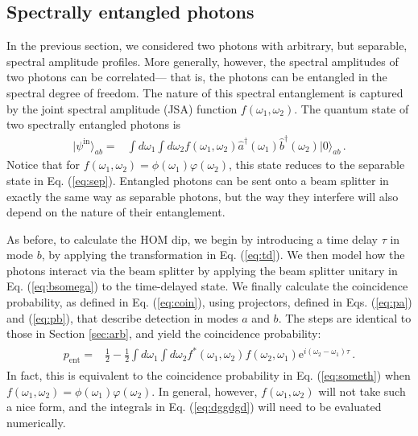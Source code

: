 \documentclass[12pt]{article}
\newcommand{\ket}[2] {| #1 \rangle_{#2}}
\newcommand{\dg}{^{\dagger}}
\newcommand{\ee}[1] {\mathrm{e}^{#1}}
\begin{document}
\subsection{Spectrally entangled photons}

In the previous section, we considered two photons with arbitrary, but separable, spectral amplitude profiles. More generally, however, the spectral amplitudes of two photons can be correlated--- that is, the photons can be entangled in the spectral degree of freedom. The nature of this spectral entanglement is captured by the joint spectral amplitude (JSA) function $f(\omega_1,\omega_2)$. The quantum state of two spectrally entangled photons is
\begin{align}\label{eq:entangled}
\ket{\psi^{\mathrm{in}}}{ab}={}&\int d\omega_1\int d\omega_2f(\omega_1,\omega_2)\hat{a}\dg(\omega_1)\hat{b}\dg(\omega_2)\ket{0}{ab}\,.
\end{align}
Notice that for $f(\omega_{1},\omega_{2})=\phi(\omega_{1})\varphi(\omega_{2})$, this state reduces to the separable state in Eq. (\ref{eq:sep}). Entangled photons can be sent onto a beam splitter in exactly the same way as separable photons, but the way they interfere will also depend on the nature of their entanglement.  

As before, to calculate the HOM dip, we begin by  introducing a time delay $\tau$ in mode $b$, by applying the transformation in Eq. (\ref{eq:td}). We then model how the photons interact via the beam splitter by applying the beam splitter unitary in Eq. (\ref{eq:bsomega}) to the time-delayed state. We finally calculate the coincidence probability, as defined in Eq. (\ref{eq:coin}), using  projectors, defined in Eqs. (\ref{eq:pa}) and  (\ref{eq:pb}), that describe detection in modes $a$  and $b$. The steps are identical to  those in Section \ref{sec:arb}, and yield the coincidence probability:
\begin{align}\label{eq:dggdgd}
\begin{split}
p_{\mathrm{ent}}={}&\frac{1}{2}- \frac{1}{2}\int d\omega_{1} \int d\omega_{2}f^*(\omega_{1},\omega_{2}) f(\omega_{2},\omega_{1})\ee{i(\omega_2-\omega_{1}) \tau}\,.
\end{split}
\end{align}
In fact, this is equivalent to the coincidence probability in Eq. (\ref{eq:someth}) when $f(\omega_{1},\omega_{2})=\phi(\omega_{1})\varphi(\omega_{2})$. In general, however, $f(\omega_{1},\omega_{2})$ will not take such a nice form, and the integrals in Eq. (\ref{eq:dggdgd}) will need to be evaluated numerically. 
\end{document}
